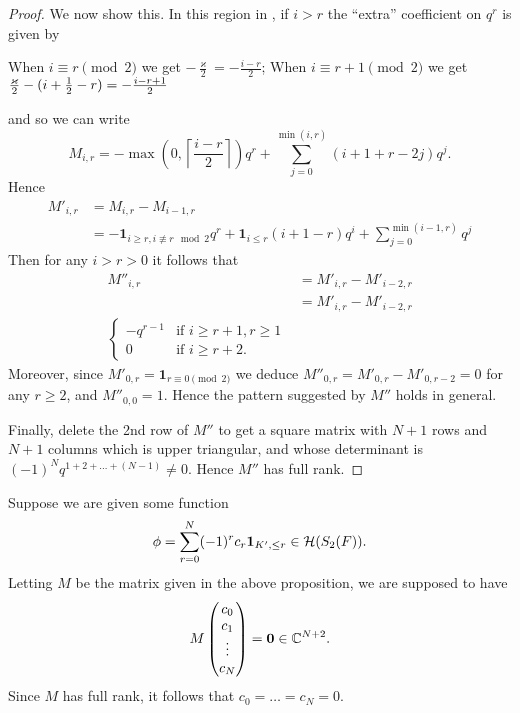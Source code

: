 \begin{proof}
  We now show this.
  In this region in , if $i > r$
  the ``extra'' coefficient on $q^r$ is given by
  \begin{itemize}
    \ii When $i \equiv r \pmod 2$ we get $-\frac{\varkappa}{2} = - \frac{i-r}{2}$;
    \ii When $i \equiv r+1 \pmod 2$ we get $\frac{\varkappa}{2} - (i + \frac{1}{2} - r) = -\frac{i-r+1}{2}$
  \end{itemize}
  and so we can write
  \[
    M_{i,r}
    = - \max\left(0, \left\lceil \frac{i-r}{2} \right\rceil \right) q^{r}
    + \sum_{j=0}^{\min(i,r)} \left( i + 1 + r - 2j \right) q^j.
  \]
  Hence
  \begin{align*}
    M'_{i,r}
    &= M_{i,r} - M_{i-1,r} \\
    &= - \mathbf{1}_{i \ge r, i \not\equiv r \mod 2} q^r
    + \mathbf{1}_{i \le r} (i+1-r) q^i
    + \sum_{j=0}^{\min(i-1,r)} q^j
  \end{align*}
  Then for any $i > r > 0$ it follows that
  \begin{align*}
    M''_{i,r}
    &= M'_{i,r} - M'_{i-2,r} \\
    &= M'_{i,r} - M'_{i-2,r} \\
    \begin{cases}
      -q^{r-1} & \text{if } i \ge r+1, r \ge 1 \\
      0 & \text{if } i \ge r+2.
    \end{cases}
  \end{align*}
  Moreover, since $M'_{0,r} = \mathbf{1}_{r \equiv 0 \pmod 2}$
  we deduce
  $M''_{0,r} = M'_{0,r} - M'_{0,r-2} = 0$
  for any $r \ge 2$, and $M''_{0,0} = 1$.
  Hence the pattern suggested by $M''$ holds in general.

  Finally, delete the 2nd row of $M''$ to get a square matrix
  with $N+1$ rows and $N+1$ columns which is upper triangular,
  and whose determinant is $(-1)^N q^{1+2+\dots+(N-1)} \neq 0$.
  Hence $M''$ has full rank.
\end{proof}

Suppose we are given some function
\[ \phi = \sum_{r=0}^N (-1)^r c_r \mathbf{1}_{K', \le r} \in \mathcal H(S_2(F)). \]
Letting $M$ be the matrix given in the above proposition, we are supposed to have
\[
  M \begin{pmatrix} c_0 \\ c_1 \\ \vdots \\ c_N \end{pmatrix}
  = \mathbf{0} \in \mathbb C^{N+2}.
\]
Since $M$ has full rank, it follows that $c_0 = \dots = c_N = 0$.

